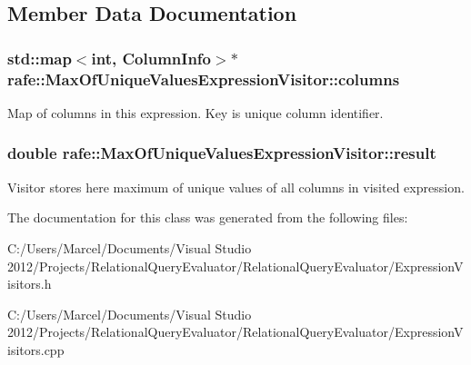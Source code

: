 \subsection{Member Data Documentation}
\hypertarget{classrafe_1_1_max_of_unique_values_expression_visitor_a11f28e944ba731456477cc8ec13c73e5}{
\subsubsection[{columns}]{\setlength{\rightskip}{0pt plus 5cm}std\+::map$<$int, {\bf Column\+Info}$>$$\ast$ rafe\+::\+Max\+Of\+Unique\+Values\+Expression\+Visitor\+::columns}}\label{classrafe_1_1_max_of_unique_values_expression_visitor_a11f28e944ba731456477cc8ec13c73e5}
Map of columns in this expression. Key is unique column identifier. \hypertarget{classrafe_1_1_max_of_unique_values_expression_visitor_a759f44c4d4b051aec0f057bead093f77}{
\subsubsection[{result}]{\setlength{\rightskip}{0pt plus 5cm}double rafe\+::\+Max\+Of\+Unique\+Values\+Expression\+Visitor\+::result}}\label{classrafe_1_1_max_of_unique_values_expression_visitor_a759f44c4d4b051aec0f057bead093f77}
Visitor stores here maximum of unique values of all columns in visited expression. 

The documentation for this class was generated from the following files\+:\begin{DoxyCompactItemize}
\item 
C\+:/\+Users/\+Marcel/\+Documents/\+Visual Studio 2012/\+Projects/\+Relational\+Query\+Evaluator/\+Relational\+Query\+Evaluator/Expression\+Visitors.\+h\item 
C\+:/\+Users/\+Marcel/\+Documents/\+Visual Studio 2012/\+Projects/\+Relational\+Query\+Evaluator/\+Relational\+Query\+Evaluator/Expression\+Visitors.\+cpp\end{DoxyCompactItemize}
